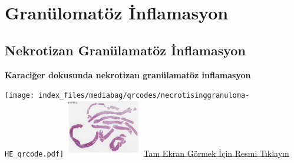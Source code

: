 \documentclass[
  letterpaper,
  DIV=11,
  numbers=noendperiod]{scrreprt}
\begin{document}
\section{Granülomatöz İnflamasyon}\label{sec-granulomatoz-inflamasyon}

\subsection{Nekrotizan Granülamatöz
İnflamasyon}\label{sec-nekrotizan-granulamatoz-inflamasyon}

\textbf{Karaciğer dokusunda nekrotizan granülamatöz inflamasyon}

\texttt{[image: index\_files/mediabag/qrcodes/necrotisinggranuloma-HE\_qrcode.pdf]}
\href{https://images.patolojiatlasi.com/necrotisinggranuloma/HE.html}{\includegraphics[width=0.25\textwidth,height=\textheight]{./screenshots/thumbnail_necrotisinggranuloma.png}}
\href{https://images.patolojiatlasi.com/necrotisinggranuloma/HE.html}{Tam
Ekran Görmek İçin Resmi Tıklayın}
\end{document}
